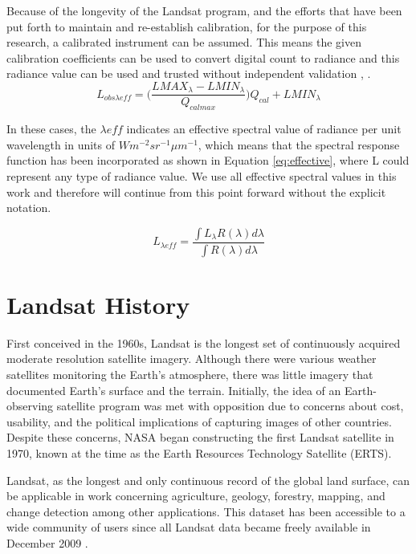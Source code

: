 \documentclass{book}
\begin{document}
Because of the longevity of the Landsat program, and the efforts that have been put forth to maintain and re-establish calibration, for the purpose of this research, a calibrated instrument can be assumed.  This means the given calibration coefficients can be used to convert digital count to radiance and this radiance value can be used and trusted without independent validation \cite{barsi_2003}, \cite{padula_2010}. \\

\begin{equation}
L_{obs{{\lambda}eff}} = \bigg(\frac{LMAX_\lambda - LMIN_\lambda}{Q_{calmax}}\bigg)Q_{cal}+LMIN_\lambda
\label{eq:calibration}
\end{equation}

In these cases, the ${\lambda}eff$ indicates an effective spectral value of radiance per unit wavelength in units of $Wm^{-2}sr^{-1}{\mu}m^{-1}$, which means that the spectral response function has been incorporated as shown in Equation \ref{eq:effective}, where L could represent any type of radiance value.  We use all effective spectral values in this work and therefore will continue from this point forward without the explicit notation.

\begin{equation}
L_{{\lambda}eff} = \frac{\int{L_{\lambda}R(\lambda)d\lambda}}{\int{R(\lambda)d\lambda}}
\label{eq:effective}
\end{equation}

\section{Landsat History}
\label{sec:landsathistory}

First conceived in the 1960s, Landsat is the longest set of continuously acquired moderate resolution satellite imagery.  Although there were various weather satellites monitoring the Earth's atmosphere, there was little imagery that documented Earth's surface and the terrain.  Initially, the idea of an Earth-observing satellite program was met with opposition due to concerns about cost, usability, and the political implications of capturing images of other countries.  Despite these concerns, NASA began constructing the first Landsat satellite in 1970, known at the time as the Earth Resources Technology Satellite (ERTS).

Landsat, as the longest and only continuous record of the global land surface, can be applicable in work concerning agriculture, geology, forestry, mapping, and change detection among other applications.  This dataset has been accessible to a wide community of users since all Landsat data became freely available in December 2009 \cite{landsat_nasa}.
\end{document}
